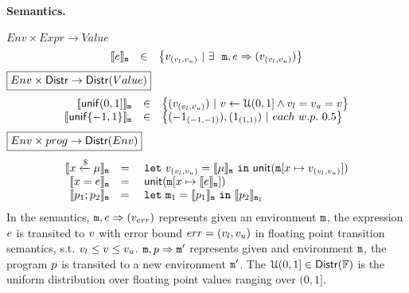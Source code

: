 \documentclass[a4paper,11pt]{article}
\begin{document}
\paragraph{Semantics.}
$\boxed{Env \times Expr \to Value }$
%
\[
	\begin{array}{rcl}
	\llbracket e \rrbracket_{\mathtt{m}}
	& \in &  
	\big\{v_{(v_{l}, v_{u})} ~|~
	\exists ~~  
	\mathtt{m},  
	e \Rightarrow (v_{(v_{l}, v_{u})})\big\}
	\end{array}
\]
%
$
\boxed{Env \times \mathsf{Distr} \to 
\mathsf{Distr}(Value)}
$
%
\[
	\begin{array}{rcl}
	\llbracket \mathsf{unif}(0, 1] \rrbracket_{\mathtt{m}}
	& \in & 
	\big\{
	(v_{(v_{l}, v_{u})}) ~|~
	v \leftarrow \mathcal{U}(0, 1]
	\land v_{l} = v_{u} = v
	\big\}\\
	\llbracket \mathsf{unif}\{-1, 1\} \rrbracket_{\mathtt{m}}
	& \in & 
	\big\{
	(-1_{(-1, -1)}), (1_{(1, 1)}) ~|~
	each ~ w.p. ~ 0.5 
	\big\}\\	
	\end{array}
\]
%
$\boxed{Env \times prog \to \mathsf{Distr}(Env)}$
\[
\begin{array}{rcl}
	\llbracket x \xleftarrow{\$} \mu \rrbracket_{\mathtt{m}}
	& = & 
	~\mathtt{let}~ v_{(v_{l}, v_{u})} = \llbracket \mu \rrbracket_{\mathtt{m}}
	~\mathtt{in}~ 
	\mathsf{unit}(\mathtt{m}[x \mapsto v_{(v_{l}, v_{u})}])
	\\
	\llbracket x = e \rrbracket_{\mathtt{m}}
	& = &  
	~\mathsf{unit}(\mathtt{m}[x \mapsto \llbracket e \rrbracket_{\mathtt{m}}])
	\\
	\llbracket p_1; p_2 \rrbracket_{\mathtt{m}}
	& = &  ~\mathtt{let}~  \mathtt{m}_1 = 
	\llbracket p_1 \rrbracket_{\mathtt{m}} ~\mathtt{in}~
	\llbracket p_2 \rrbracket_{\mathtt{m}_1} 
\end{array}
\]
%
In the semantics, 
%
$\mathtt{m}, e \Rightarrow (v_{err})$ represents given an environment
%
$\mathtt{m}$, the expression $e$
%
is transited to $v$ with error bound $err = (v_{l}, v_{u})$
in floating point transition semantics,
%
s.t. $v_{l} \leq v \leq v_{u}$.
%
$\mathtt{m}, p \Rightarrow \mathtt{m}'$ represents given and environment $\mathtt{m}$,
%
the program $p$ is transited to a new environment $\mathtt{m}'$.
%
The $\mathcal{U}(0, 1] \in \mathsf{Distr}(\mathbb{F})$ is the uniform distribution over floating point values ranging over $(0, 1]$.
%
%
\end{document}
